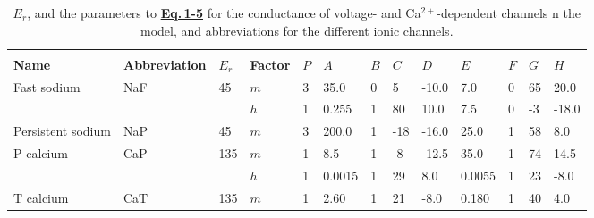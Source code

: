 \documentclass[12pt]{article}
\begin{document}
\begin{table}[h]
\caption{$E_r$, and the parameters to \href{../pub-purkinje-deschutter1-equations/pub-purkinje-deschutter1-equations.tex}{\bf Eq.\,1-5} for the conductance of voltage- and Ca$^{2+}$-dependent channels n the model, and abbreviations for the different ionic channels.}        
\begin{tabular}{ l l l l l l l l l l l l l }
                                             &                                                                         &              &                       &         &                                                      &        &          &           &                &         &          &             \\
   {\bf Name}                        & {\bf Abbreviation}                                         & {$E_r$} & {\bf Factor} & $P$ & $A$                                             & $B$ & $C$ & $D$   & $E$       & $F$ & $G$  & $H$   \\
   Fast sodium                     & NaF                                                                & 45          & $m$             & 3      & 35.0                                            & 0      & 5       & -10.0 & 7.0         & 0     & 65     & 20.0   \\
                                              &                                                                         &               & $h$              & 1      & 0.255                                          & 1      & 80     & 10.0  & 7.5         & 0     & -3      & -18.0  \\
   Persistent sodium          & NaP                                                                & 45          & $m$             & 3      & 200.0                                          & 1      & -18    & -16.0 & 25.0      & 1     & 58     & 8.0      \\
   P calcium                         & CaP                                                                & 135       & $m$             & 1      & 8.5                                               & 1      & -8      & -12.5 & 35.0      & 1     & 74     & 14.5    \\
                                              &                                                                         &               & $h$              & 1      & 0.0015                                        & 1      & 29     & 8.0    & 0.0055  & 1     & 23     & -8.0    \\
   T calcium                         & CaT                                                                 & 135      & $m$              & 1      & 2.60                                             & 1      & 21    & -8.0   & 0.180     & 1     & 40     & 4.0     \\

\end{tabular}
\end{table}
\end{document}
